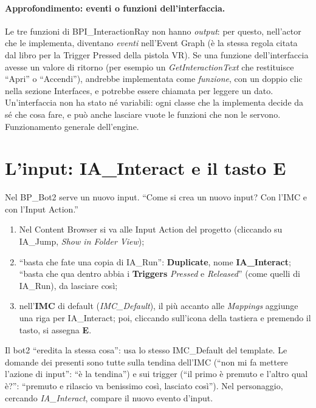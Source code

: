 \paragraph{Approfondimento: eventi o funzioni dell'interfaccia.} Le tre funzioni di
BPI\_InteractionRay non hanno \emph{output}: per questo, nell'actor che le implementa,
diventano \emph{eventi} nell'Event Graph (è la stessa regola citata dal libro per la Trigger
Pressed della pistola VR). Se una funzione dell'interfaccia avesse un valore di ritorno (per
esempio un \emph{GetInteractionText} che restituisce ``Apri'' o ``Accendi''), andrebbe
implementata come \emph{funzione}, con un doppio clic nella sezione Interfaces, e potrebbe
essere chiamata per leggere un dato. Un'interfaccia non ha stato né variabili: ogni classe
che la implementa decide da sé che cosa fare, e può anche lasciare vuote le funzioni che non
le servono. Funzionamento generale dell'engine.

\section{L'input: IA\_Interact e il tasto E}
\label{ue12:sec:input}

Nel BP\_Bot2 serve un nuovo input. ``Come si crea un nuovo input? Con l'IMC e con l'Input
Action.''
\begin{enumerate}
  \item Nel Content Browser si va alle Input Action del progetto (cliccando su IA\_Jump,
        \emph{Show in Folder View});
  \item ``basta che fate una copia di IA\_Run'': \textbf{Duplicate}, nome
        \textbf{IA\_Interact}; ``basta che qua dentro abbia i \textbf{Triggers}
        \emph{Pressed} e \emph{Released}'' (come quelli di IA\_Run), da lasciare così;
  \item nell'\textbf{IMC} di default (\emph{IMC\_\allowbreak Default}), il più accanto alle
        \emph{Mappings} aggiunge una riga per IA\_Interact; poi, cliccando sull'icona
        della tastiera e premendo il tasto, si assegna \textbf{E}.
\end{enumerate}
Il bot2 ``eredita la stessa cosa'': usa lo stesso IMC\_Default del template. Le domande dei
presenti sono tutte sulla tendina dell'IMC (``non mi fa mettere l'azione di input'': ``è la
tendina'') e sui trigger (``il primo è premuto e l'altro qual è?'': ``premuto e rilascio va
benissimo così, lasciato così''). Nel personaggio, cercando \emph{IA\_Interact}, compare il
nuovo evento d'input.

